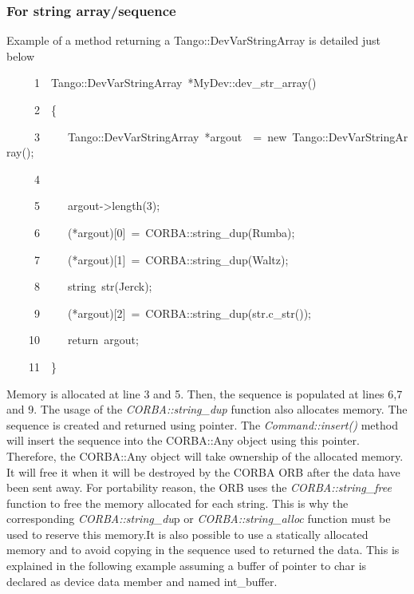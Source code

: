 \vspace{0.3cm}


\subsubsection{For string array/sequence}

Example of a method returning a Tango::DevVarStringArray
is detailed just below


\begin{lyxcode}
~~~~~1~~Tango::DevVarStringArray~{*}MyDev::dev\_str\_array()

~~~~~2~~\{

~~~~~3~~~~~Tango::DevVarStringArray~{*}argout~~=~new~Tango::DevVarStringArray();

~~~~~4~~

~~~~~5~~~~~argout->length(3);

~~~~~6~~~~~({*}argout){[}0{]}~=~CORBA::string\_dup(\textquotedbl{}Rumba\textquotedbl{});

~~~~~7~~~~~({*}argout){[}1{]}~=~CORBA::string\_dup(\textquotedbl{}Waltz\textquotedbl{});

~~~~~8~~~~~string~str(\textquotedbl{}Jerck\textquotedbl{});

~~~~~9~~~~~({*}argout){[}2{]}~=~CORBA::string\_dup(str.c\_str());

~~~~10~~~~~return~argout;

~~~~11~~\}
\end{lyxcode}


Memory is allocated at line 3 and 5. Then, the sequence
is populated at lines 6,7 and 9. The usage of the \emph{CORBA::string\_dup}
function also allocates memory. The sequence is created and returned
using pointer. The \emph{Command::insert()} method will insert the
sequence into the CORBA::Any object using this pointer. Therefore,
the CORBA::Any object will take ownership of the allocated memory.
It will free it when it will be destroyed by the CORBA ORB after the
data have been sent away. For portability reason, the ORB uses the
\emph{CORBA::string\_free} function to free the
memory allocated for each string. This is why the corresponding
\emph{CORBA::string\_du}p or \emph{CORBA::string\_alloc}
function must be used to reserve this memory.It is also possible to
use a statically allocated memory and to avoid copying in the sequence
used to returned the data. This is explained in the following example
assuming a buffer of pointer to char is declared as device data member
and named int\_buffer.

